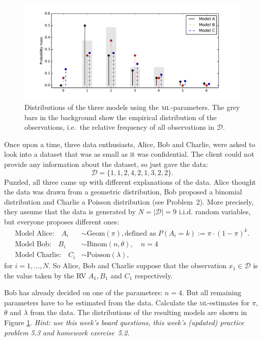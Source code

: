 \documentclass[a4paper,10pt,landscape,twocolumn]{scrartcl}
\begin{document}
\begin{figure}
	\includegraphics[width=.5\textwidth]{media/05-distributions}
	\caption{Distributions of the three models using the $\textsc{ml}$-parameters. The grey bars in the background show the empirical distribution of the observations, i.e.\ the relative frequency of all observations in $\mathcal{D}$.\label{fig:models}}
\end{figure}


\begin{exercise}
Once upon a time, three data enthusiasts, Alice, Bob and Charlie, were asked to look into a dataset that was as small as it was confidential. The client could not provide any information about the dataset, so just gave the data:
	\[
		\mathcal{D} = \{ 1, 1, 2, 4, 2, 1, 3, 2, 2 \}.
	\]
	Puzzled, all three came up with different explanations of the data. Alice thought the data was drawn from a geometric distribution, Bob proposed a binomial distribution and Charlie a Poisson distribution (see Problem~2). More precisely, they assume that the data is generated by $N = |\mathcal D|=9$ i.i.d. random variables, but everyone proposes different ones:
	\begin{align*}
		\text{Model Alice:} \quad A_i &\sim \text{Geom}(\pi), \mbox{defined as $P(A_i=k):=\pi \cdot (1-\pi)^k$.}\\
		\text{Model Bob:} \quad B_i &\sim \text{Binom}(n, \theta), \quad n=4\\
		\text{Model Charlie:} \quad C_i &\sim \text{Poisson}(\lambda),
	\end{align*}
	for $i = 1, \dots, N$. So Alice, Bob and Charlie suppose that the observation $x_1 \in \mathcal D$ is the value taken by the RV $A_1, B_1$ and $C_1$ respectively.
	
	\begin{subex}[1pt]
	Bob has already decided on one of the parameters: $n=4$. But all remaining parameters have to be estimated from the data. Calculate the \textsc{ml}-estimates for $\pi$, $\theta$ and $\lambda$ from the data. The distributions of the resulting models are shown in Figure \ref{fig:models}. 
	\emph{Hint: use this week's board questions, this week's (updated) practice problem 5.3 and homework exercise~5.2}.
	\end{subex}
	

\end{exercise}
\end{document}

